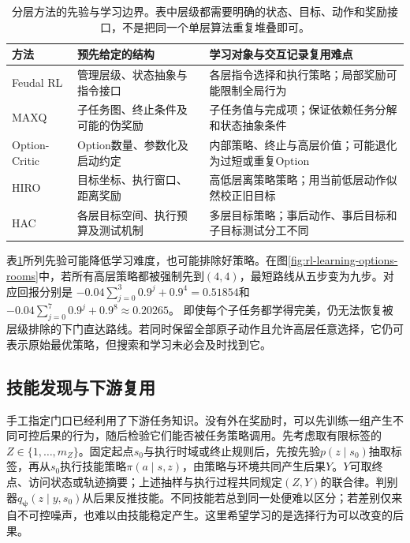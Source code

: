 \begin{table}[t]
  \centering
  \small
  \begin{tabularx}{\linewidth}{>{\raggedright\arraybackslash}p{22mm} >{\raggedright\arraybackslash}X >{\raggedright\arraybackslash}X}
    \toprule
    方法 & 预先给定的结构 & 学习对象与交互记录复用难点 \\
    \midrule
    Feudal RL & 管理层级、状态抽象与指令接口 & 各层指令选择和执行策略；局部奖励可能限制全局行为 \\
    MAXQ & 子任务图、终止条件及可能的伪奖励 & 子任务值与完成项；保证依赖任务分解和状态抽象条件 \\
    Option-Critic & Option数量、参数化及启动约定 & 内部策略、终止与高层价值；可能退化为过短或重复Option \\
    HIRO & 目标坐标、执行窗口、距离奖励 & 高低层离策略策略；用当前低层动作似然校正旧目标 \\
    HAC & 各层目标空间、执行预算及测试机制 & 多层目标策略；事后动作、事后目标和子目标测试分工不同 \\
    \bottomrule
  \end{tabularx}
  \caption{分层方法的先验与学习边界。表中层级都需要明确的状态、目标、动作和奖励接口，不是把同一个单层算法重复堆叠即可。}
  \label{tab:rl-learning-hierarchy-methods}
\end{table}

表\ref{tab:rl-learning-hierarchy-methods}所列先验可能降低学习难度，也可能排除好策略。在图\ref{fig:rl-learning-options-rooms}中，若所有高层策略都被强制先到$(4,4)$，最短路线从五步变为九步。对应回报分别是
$-0.04\sum_{j=0}^{3}0.9^j+0.9^4=0.51854$和
$-0.04\sum_{j=0}^{7}0.9^j+0.9^8\approx0.20265$。
即使每个子任务都学得完美，仍无法恢复被层级排除的下门直达路线。若同时保留全部原子动作且允许高层任意选择，它仍可表示原始最优策略，但搜索和学习未必会及时找到它。

\subsection{技能发现与下游复用}
\label{sec:rl-learning-skill-discovery}

手工指定门口已经利用了下游任务知识。没有外在奖励时，可以先训练一组产生不同可控后果的行为，随后检验它们能否被任务策略调用。先考虑取有限标签的$Z\in\{1,\ldots,m_Z\}$。固定起点$s_0$与执行时域或终止规则后，先按先验$p(z\mid s_0)$抽取标签，再从$s_0$执行技能策略$\pi(a\mid s,z)$，由策略与环境共同产生后果$Y$。$Y$可取终点、访问状态或轨迹摘要；上述抽样与执行过程共同规定$(Z,Y)$的联合律。判别器$q_{\bm\psi}(z\mid y,s_0)$从后果反推技能。不同技能若总到同一处便难以区分；若差别仅来自不可控噪声，也难以由技能稳定产生。这里希望学习的是选择行为可以改变的后果。

